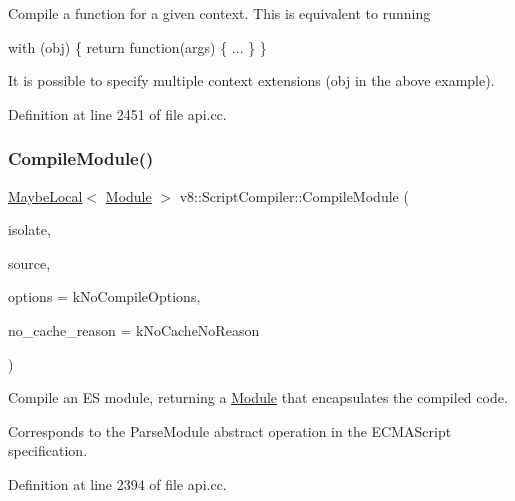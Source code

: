 Compile a function for a given context. This is equivalent to running

with (obj) \{ return function(args) \{ ... \} \}

It is possible to specify multiple context extensions (obj in the above example). 

Definition at line 2451 of file api.\+cc.

\mbox{\label{classv8_1_1ScriptCompiler_a3b3aed3622a957a4af4ced80348dcb9e}} 
\subsubsection{\texorpdfstring{Compile\+Module()}{CompileModule()}}
{\footnotesize\ttfamily \mbox{\hyperlink{classv8_1_1MaybeLocal}{Maybe\+Local}}$<$ \mbox{\hyperlink{classv8_1_1Module}{Module}} $>$ v8\+::\+Script\+Compiler\+::\+Compile\+Module (\begin{DoxyParamCaption}\item[{Isolate $\ast$}]{isolate,  }\item[{\mbox{\hyperlink{classv8_1_1ScriptCompiler_1_1Source}{Source}} $\ast$}]{source,  }\item[{Compile\+Options}]{options = {\ttfamily kNoCompileOptions},  }\item[{\mbox{\hyperlink{classv8_1_1ScriptCompiler_a7f13fa15484cfc500ae51927756e0d60}{No\+Cache\+Reason}}}]{no\+\_\+cache\+\_\+reason = {\ttfamily kNoCacheNoReason} }\end{DoxyParamCaption})\hspace{0.3cm}{\ttfamily [static]}}

Compile an ES module, returning a \mbox{\hyperlink{classv8_1_1Module}{Module}} that encapsulates the compiled code.

Corresponds to the Parse\+Module abstract operation in the E\+C\+M\+A\+Script specification. 

Definition at line 2394 of file api.\+cc.

\mbox{\label{classv8_1_1ScriptCompiler_a65f85be54b26efb1f47543c5895f7008}} 
